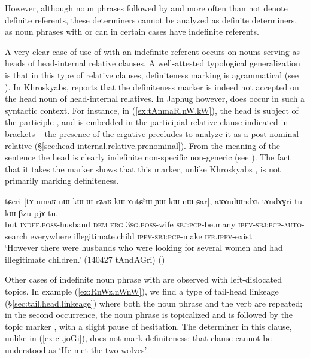 However, although noun phrases followed by  and  more often than not denote definite referents, these determiners cannot be analyzed as definite determiners, as noun phrases with  or  can in certain cases have indefinite referents. 

A very clear case of use of  with an indefinite referent occurs on nouns serving as heads of head-internal relative clauses. A well-attested typological generalization is that in this type of relative clauses, definiteness marking is agrammatical (see \citealt{basilico96internally}). In Khroskyabs, \citet[636]{lai17khroskyabs} reports that the definiteness marker  is indeed not accepted on the head noun of head-internal relatives. In Japhug however,  does occur in such a syntactic context. For instance, in (\ref{ex:tAnmaR.nW.kW}), the head  is subject of the participle , and is embedded in the participial relative clause indicated in brackets -- the presence of the ergative  precludes to analyze it as a post-nominal relative (§\ref{sec:head-internal.relative.prenominal}). From the meaning of the sentence the head  is clearly indefinite non-specific non-generic  (see \citealt[286--291]{lehmann84relativsatz}). The fact that it takes the marker  shows that this marker, unlike Khroskyabs , is not primarily marking definiteness.

\begin{exe}
\ex \label{ex:tAnmaR.nW.kW}
 \gll tɕeri [tɤ-nmaʁ nɯ kɯ ɯ-rʑaʁ kɯ-ɤntɕʰɯ ɲɯ-kɯ-nɯ-ɕar], aʁɤndɯndɤt tɤndɤɣri tu-kɯ-βzu pjɤ-tu.  \\
but  \textsc{indef}.\textsc{poss}-husband \textsc{dem} \textsc{erg} \textsc{3sg}.\textsc{poss}-wife  \textsc{sbj}:\textsc{pcp}-be.many \textsc{ipfv}-\textsc{sbj}:\textsc{pcp}-\textsc{auto}-search everywhere  illegitimate.child  \textsc{ipfv}-\textsc{sbj}:\textsc{pcp}-make \textsc{ifr}.\textsc{ipfv}-exist \\
\glt `However there were husbands who were looking for several women and had illegitimate children.' (140427 tAndAGri) ()
\end{exe}

Other cases of indefinite noun phrase with  are observed with left-dislocated topics. In example (\ref{ex:RnWz.nWnW}), we find a type of tail-head linkeage  (§\ref{sec:tail.head.linkeage}) where both the noun phrase  and the verb  are repeated; in the second occurrence, the noun phrase is topicalized and is followed by the topic marker , with a slight pause of hesitation. The determiner  in this clause, unlike  in (\ref{ex:ci.joGi}), does not mark definiteness: that clause cannot be understood as `He met the two wolves'.

